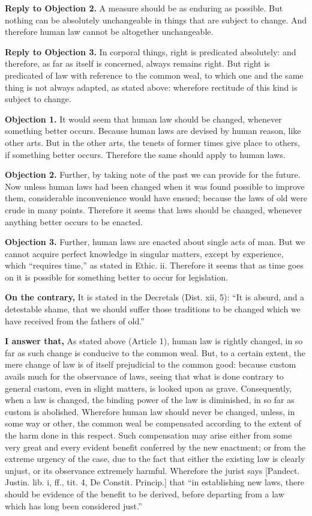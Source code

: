 \textbf{Reply to Objection 2.} A measure should be as enduring as possible. But nothing can be absolutely unchangeable in things that are subject to change. And therefore human law cannot be altogether unchangeable.

\textbf{Reply to Objection 3.} In corporal things, right is predicated absolutely: and therefore, as far as itself is concerned, always remains right. But right is predicated of law with reference to the common weal, to which one and the same thing is not always adapted, as stated above: wherefore rectitude of this kind is subject to change.


\textbf{Objection 1.} It would seem that human law should be changed, whenever something better occurs. Because human laws are devised by human reason, like other arts. But in the other arts, the tenets of former times give place to others, if something better occurs. Therefore the same should apply to human laws.

\textbf{Objection 2.} Further, by taking note of the past we can provide for the future. Now unless human laws had been changed when it was found possible to improve them, considerable inconvenience would have ensued; because the laws of old were crude in many points. Therefore it seems that laws should be changed, whenever anything better occurs to be enacted.

\textbf{Objection 3.} Further, human laws are enacted about single acts of man. But we cannot acquire perfect knowledge in singular matters, except by experience, which ``requires time,'' as stated in Ethic. ii. Therefore it seems that as time goes on it is possible for something better to occur for legislation.

\textbf{On the contrary,} It is stated in the Decretals (Dist. xii, 5): ``It is absurd, and a detestable shame, that we should suffer those traditions to be changed which we have received from the fathers of old.''

\textbf{I answer that,} As stated above (Article 1), human law is rightly changed, in so far as such change is conducive to the common weal. But, to a certain extent, the mere change of law is of itself prejudicial to the common good: because custom avails much for the observance of laws, seeing that what is done contrary to general custom, even in slight matters, is looked upon as grave. Consequently, when a law is changed, the binding power of the law is diminished, in so far as custom is abolished. Wherefore human law should never be changed, unless, in some way or other, the common weal be compensated according to the extent of the harm done in this respect. Such compensation may arise either from some very great and every evident benefit conferred by the new enactment; or from the extreme urgency of the case, due to the fact that either the existing law is clearly unjust, or its observance extremely harmful. Wherefore the jurist says [Pandect. Justin. lib. i, ff., tit. 4, De Constit. Princip.] that ``in establishing new laws, there should be evidence of the benefit to be derived, before departing from a law which has long been considered just.''

